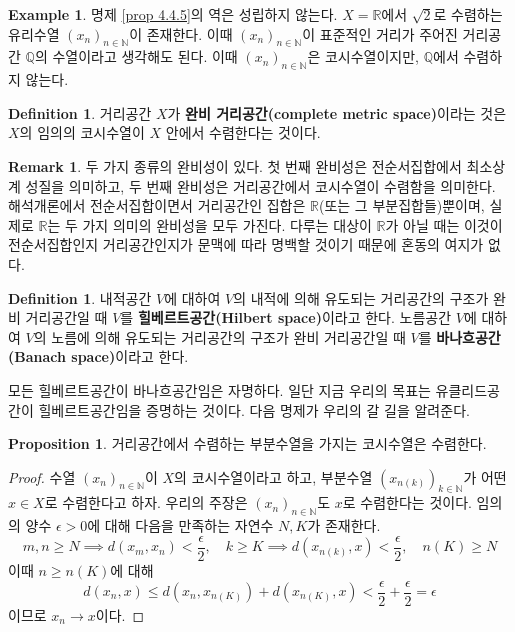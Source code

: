 \documentclass[11pt]{book}
\numberwithin{equation}{chapter}
\def\NN{\mathbb{N}}
\def\QQ{\mathbb{Q}}
\def\RR{\mathbb{R}}
\def\eps{\epsilon}
\theoremstyle{definition}
\newtheorem{prop}[thm]{Proposition}
\newtheorem{defn}[thm]{Definition}
\newtheorem*{rem}{Remark}
\newtheorem*{ex}{Example}
\begin{document}
\begin{ex}
    명제 \ref{prop 4.4.5}의 역은 성립하지 않는다. \(X = \RR\)에서 \(\sqrt{2}\)로 수렴하는 유리수열 \((x_n)_{n \in \NN}\)이 존재한다. 이때 \((x_n)_{n \in \NN}\)이 표준적인 거리가 주어진 거리공간 \(\QQ\)의 수열이라고 생각해도 된다. 이때 \((x_n)_{n \in \NN}\)은 코시수열이지만, \(\QQ\)에서 수렴하지 않는다.
\end{ex}

\begin{defn}
    거리공간 \(X\)가 \textbf{완비 거리공간(complete metric space)}이라는 것은 \(X\)의 임의의 코시수열이 \(X\) 안에서 수렴한다는 것이다.
\end{defn}

\begin{rem}
    두 가지 종류의 완비성이 있다. 첫 번째 완비성은 전순서집합에서 최소상계 성질을 의미하고, 두 번째 완비성은 거리공간에서 코시수열이 수렴함을 의미한다. 해석개론에서 전순서집합이면서 거리공간인 집합은 \(\RR\)(또는 그 부분집합들)뿐이며, 실제로 \(\RR\)는 두 가지 의미의 완비성을 모두 가진다. 다루는 대상이 \(\RR\)가 아닐 때는 이것이 전순서집합인지 거리공간인지가 문맥에 따라 명백할 것이기 때문에 혼동의 여지가 없다.
\end{rem}

\begin{defn}
    내적공간 \(V\)에 대하여 \(V\)의 내적에 의해 유도되는 거리공간의 구조가 완비 거리공간일 때 \(V\)를 \textbf{힐베르트공간(Hilbert space)}이라고 한다. 노름공간 \(V\)에 대하여 \(V\)의 노름에 의해 유도되는 거리공간의 구조가 완비 거리공간일 때 \(V\)를 \textbf{바나흐공간(Banach space)}이라고 한다.
\end{defn}

모든 힐베르트공간이 바나흐공간임은 자명하다. 일단 지금 우리의 목표는 유클리드공간이 힐베르트공간임을 증명하는 것이다. 다음 명제가 우리의 갈 길을 알려준다.

\begin{prop} \label{prop 4.4.7}
    거리공간에서 수렴하는 부분수열을 가지는 코시수열은 수렴한다.
\end{prop}
\begin{proof}
    수열 \((x_n)_{n \in \NN}\)이 \(X\)의 코시수열이라고 하고, 부분수열 \((x_{n(k)})_{k \in \NN}\)가 어떤 \(x \in X\)로 수렴한다고 하자. 우리의 주장은 \((x_n)_{n \in \NN}\)도 \(x\)로 수렴한다는 것이다. 임의의 양수 \(\eps > 0\)에 대해 다음을 만족하는 자연수 \(N, K\)가 존재한다.
    \[
    m, n \ge N \implies d(x_m, x_n) < \frac{\eps}{2}, \quad k \ge K \implies d(x_{n(k)}, x) < \frac{\eps}{2}, \quad n(K) \ge N
    \]
    이때 \(n \ge n(K)\)에 대해
    \[
    d(x_n, x) \le d(x_n, x_{n(K)}) + d(x_{n(K)}, x) < \frac{\eps}{2} + \frac{\eps}{2} = \eps
    \]
    이므로 \(x_n \to x\)이다.
\end{proof}
\end{document}
